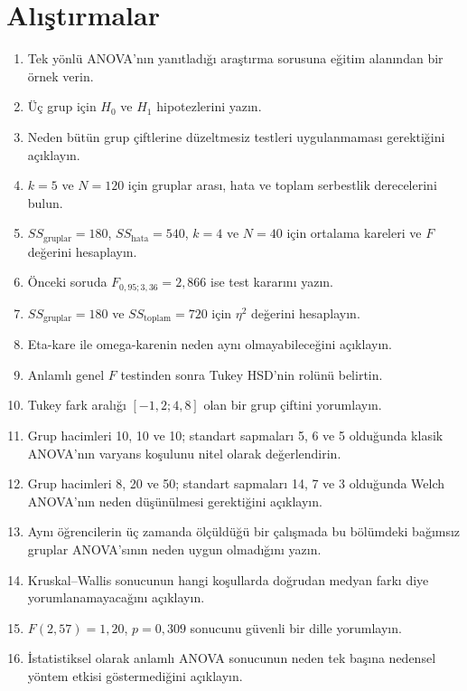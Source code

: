 \section*{Alıştırmalar}

\begin{enumerate}
  \item Tek yönlü ANOVA'nın yanıtladığı araştırma sorusuna eğitim alanından bir örnek verin.
  \item Üç grup için $H_0$ ve $H_1$ hipotezlerini yazın.
  \item Neden bütün grup çiftlerine düzeltmesiz \tstat testleri uygulanmaması gerektiğini açıklayın.
  \item $k=5$ ve $N=120$ için gruplar arası, hata ve toplam serbestlik derecelerini bulun.
  \item $SS_{\text{gruplar}}=180$, $SS_{\text{hata}}=540$, $k=4$ ve $N=40$ için ortalama kareleri ve $F$ değerini hesaplayın.
  \item Önceki soruda $F_{0{,}95;3,36}=2{,}866$ ise test kararını yazın.
  \item $SS_{\text{gruplar}}=180$ ve $SS_{\text{toplam}}=720$ için $\eta^2$ değerini hesaplayın.
  \item Eta-kare ile omega-karenin neden aynı olmayabileceğini açıklayın.
  \item Anlamlı genel $F$ testinden sonra Tukey HSD'nin rolünü belirtin.
  \item Tukey fark aralığı $[-1{,}2;4{,}8]$ olan bir grup çiftini yorumlayın.
  \item Grup hacimleri 10, 10 ve 10; standart sapmaları 5, 6 ve 5 olduğunda klasik ANOVA'nın varyans koşulunu nitel olarak değerlendirin.
  \item Grup hacimleri 8, 20 ve 50; standart sapmaları 14, 7 ve 3 olduğunda Welch ANOVA'nın neden düşünülmesi gerektiğini açıklayın.
  \item Aynı öğrencilerin üç zamanda ölçüldüğü bir çalışmada bu bölümdeki bağımsız gruplar ANOVA'sının neden uygun olmadığını yazın.
  \item Kruskal--Wallis sonucunun hangi koşullarda doğrudan medyan farkı diye yorumlanamayacağını açıklayın.
  \item $F(2,57)=1{,}20$, $p=0{,}309$ sonucunu güvenli bir dille yorumlayın.
  \item İstatistiksel olarak anlamlı ANOVA sonucunun neden tek başına nedensel yöntem etkisi göstermediğini açıklayın.
\end{enumerate}